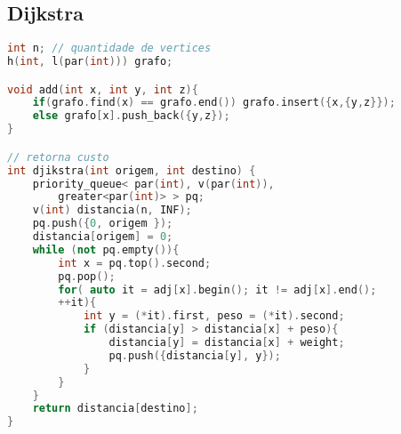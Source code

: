 \subsection{Dijkstra}



\begin{lstlisting}[language=C++, title=Usando fila de prioridade]
int n; // quantidade de vertices
h(int, l(par(int))) grafo;

void add(int x, int y, int z){
    if(grafo.find(x) == grafo.end()) grafo.insert({x,{y,z}});
    else grafo[x].push_back({y,z});
}

// retorna custo
int djikstra(int origem, int destino) {
    priority_queue< par(int), v(par(int)), 
        greater<par(int)> > pq;
    v(int) distancia(n, INF);
    pq.push({0, origem });
    distancia[origem] = 0;
    while (not pq.empty()){
        int x = pq.top().second;
        pq.pop();
        for( auto it = adj[x].begin(); it != adj[x].end(); 
        ++it){
            int y = (*it).first, peso = (*it).second;
            if (distancia[y] > distancia[x] + peso){
                distancia[y] = distancia[x] + weight;
                pq.push({distancia[y], y});
            }
        }
    }
    return distancia[destino];
}
\end{lstlisting}
\newpage